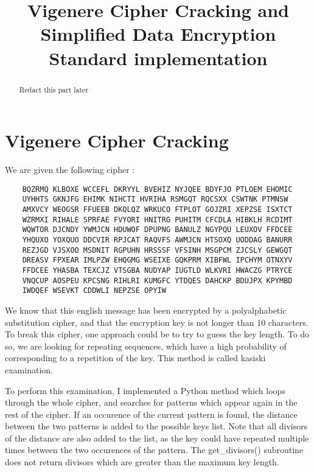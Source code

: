 \documentclass{article}
\title{\textbf{Vigenere Cipher Cracking and Simplified Data Encryption Standard implementation}}
\author{}
\date{}
\begin{document}
\maketitle \thispagestyle{fancy}

\begin{abstract}
    Redact this part later
    
\end{abstract}

\section{Vigenere Cipher Cracking}

We are given the following cipher :

\begin{verbatim}
    BQZRMQ KLBOXE WCCEFL DKRYYL BVEHIZ NYJQEE BDYFJO PTLOEM EHOMIC
    UYHHTS GKNJFG EHIMK NIHCTI HVRIHA RSMGQT RQCSXX CSWTNK PTMNSW
    AMXVCY WEOGSR FFUEEB DKQLQZ WRKUCO FTPLOT GOJZRI XEPZSE ISXTCT
    WZRMXI RIHALE SPRFAE FVYORI HNITRG PUHITM CFCDLA HIBKLH RCDIMT
    WQWTOR DJCNDY YWMJCN HDUWOF DPUPNG BANULZ NGYPQU LEUXOV FFDCEE
    YHQUXO YOXQUO DDCVIR RPJCAT RAQVFS AWMJCN HTSOXQ UODDAG BANURR
    REZJGD VJSXOO MSDNIT RGPUHN HRSSSF VFSINH MSGPCM ZJCSLY GEWGQT
    DREASV FPXEAR IMLPZW EHQGMG WSEIXE GQKPRM XIBFWL IPCHYM OTNXYV
    FFDCEE YHASBA TEXCJZ VTSGBA NUDYAP IUGTLD WLKVRI HWACZG PTRYCE
    VNQCUP AOSPEU KPCSNG RIHLRI KUMGFC YTDQES DAHCKP BDUJPX KPYMBD
    IWDQEF WSEVKT CDDWLI NEPZSE OPYIW
\end{verbatim}

We know that this english message has been encrypted by a polyalphabetic substitution cipher, and that the encryption key is not longer than 10 characters. To break this cipher, one approach could be to try to guess the key length. To do so, we are looking for repeating sequences, which have a high probability of corresponding to a repetition of the key. This method is called kasiski examination.\cite{vigenere}

To perform this examination, I implemented a Python method which loops through the whole cipher, and searches for patterns which appear again in the rest of the cipher. If an occurence of the current pattern is found, the distance between the two patterns is added to the possible keys list. Note that all divisors of the distance are also added to the list, as the key could have repeated multiple times between the two occurences of the pattern. The get\_divisors() subroutine does not return divisors which are greater than the maximum key length.
\end{document}
